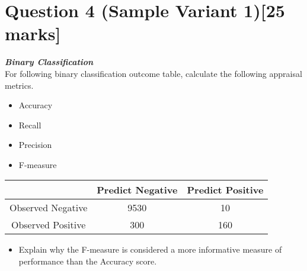 \documentclass[]{article}
\begin{document}
\section*{Question 4 (Sample Variant 1)[25 marks]}




\item[(b)] \textbf{\textit{Binary Classification }}\\
For following binary classification outcome table, calculate the following appraisal metrics.
\begin{itemize}	

\item 	Accuracy

\item 	Recall

\item 	Precision

\item  	F-measure
\end{itemize}	

\begin{center}
\begin{tabular}{|c|c|c|}
\hline  & \phantom{spa}Predict Negative\phantom{spa} & \phantom{spa}Predict Positive\phantom{spa} \\ 
\hline\phantom{spa} Observed Negative \phantom{spa}&	9530	&	10	\\ 
\hline \phantom{spa}Observed Positive\phantom{spa} & 	300	&	160	\\ 
\hline 
\end{tabular} 
\end{center}

\begin{itemize}	

\item   Explain why the F-measure is considered a more informative measure of performance than the Accuracy score.
\end{itemize}
\end{document}
